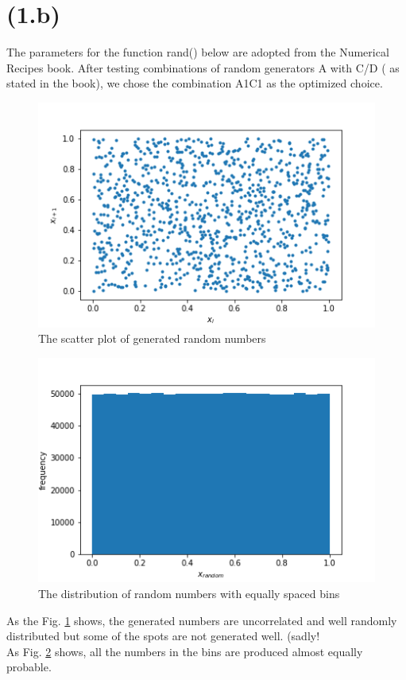 \section{(1.b)}
The parameters for the function rand() below are adopted from the Numerical Recipes book. After testing combinations of random generators A with C/D ( as stated in the book), we chose the combination A1C1 as the optimized choice.
\begin{figure}[!htb]
  \centering
  \includegraphics[width=0.7\linewidth]{Plots/scatt_1b.png}
  \caption{The scatter plot of generated random numbers}
  \label{fig:fig1}
\end{figure}

\begin{figure}[!htb]
  \centering
  \includegraphics[width=0.7\linewidth]{Plots/hist_1b.png}
  \caption{The distribution of random numbers with equally spaced bins}
  \label{fig:fig2}
\end{figure}

As the Fig. \ref{fig:fig1} shows, the generated numbers are uncorrelated and well randomly distributed but some of the spots are not generated well. (sadly!\\
As Fig. \ref{fig:fig2} shows, all the numbers in the bins are produced almost equally probable.





